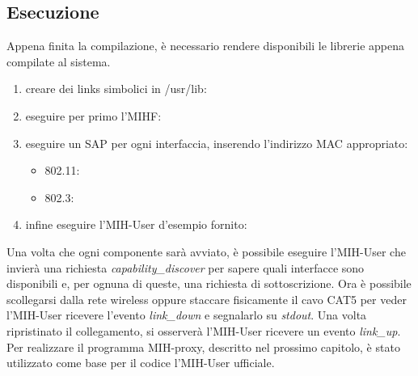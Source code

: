 \subsection{Esecuzione}

Appena finita la compilazione, è necessario rendere disponibili le librerie appena compilate al sistema.

\begin{enumerate}

\item creare dei links simbolici in /usr/lib:\\

\item eseguire per primo l'MIHF:\\

\item eseguire un SAP per ogni interfaccia, inserendo l'indirizzo MAC appropriato:
\begin{itemize}

\item 802.11:\\

\item 802.3:\\
\end{itemize}
\item infine eseguire l'MIH-User d'esempio fornito:\\

\end{enumerate}

Una volta che ogni componente sarà avviato, è possibile eseguire l'MIH-User che invierà una richiesta {\em capability\_discover} per sapere quali interfacce sono disponibili e, per ognuna di queste, una richiesta di sottoscrizione. Ora è possibile scollegarsi dalla rete wireless oppure staccare fisicamente il cavo CAT5 per veder l'MIH-User ricevere l'evento {\em link\_down} e segnalarlo su {\em stdout}. Una volta ripristinato il collegamento, si osserverà l'MIH-User ricevere un evento {\em link\_up}. Per realizzare il programma MIH-proxy, descritto nel prossimo capitolo, è stato utilizzato come base per il codice l'MIH-User ufficiale.

